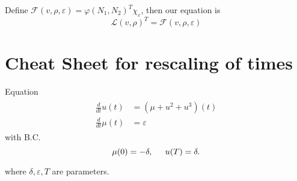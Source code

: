\documentclass[letterpaper,11pt]{article}
\newcommand{\eps}{\varepsilon}
\numberwithin{equation}{section}
\theoremstyle{plain}
\begin{document}
Define $\mathcal{F}(v,\rho,\eps) = \varphi(N_1,N_2)^T\chi_\eps$, then our equation is
\[
\mathcal{L}(v,\rho)^T  = \mathcal{F}(v,\rho,\eps)
\]
\pagebreak

\section{Cheat Sheet for rescaling of times}
Equation
\begin{align}
\begin{split}
\frac{d}{dt}u(t) &= (\mu+u^2+u^3)(t) \\
\frac{d}{dt}\mu (t)&=  \eps 
\end{split}
\end{align}
with B.C.
\begin{equation}
\mu(0) = -\delta, \hspace{0.2in} u(T) = \delta.
\end{equation}

where $\delta,\eps, T$ are parameters.
\end{document}
